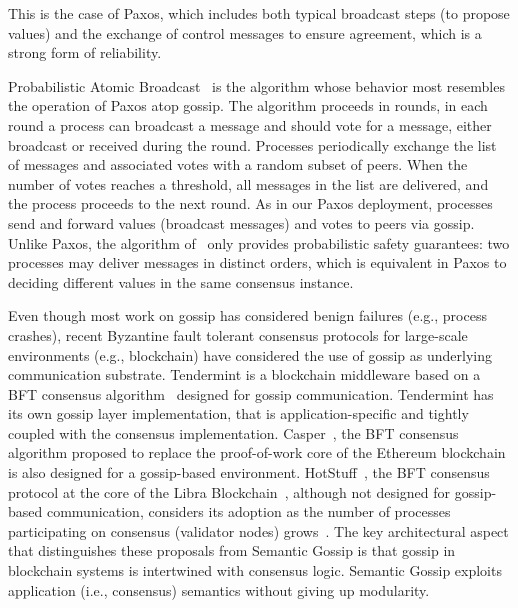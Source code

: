 \color{black}

This is the case of Paxos, which includes both typical broadcast steps (to
propose values) and the exchange of control messages to ensure agreement, which
is a strong form of reliability.

Probabilistic Atomic Broadcast~\cite{felber02} is the algorithm whose behavior
most resembles the operation of Paxos atop gossip.
The algorithm proceeds in rounds, in each round a process can broadcast a
message and should vote for a message, either broadcast or received during the
round.
Processes periodically exchange the list of messages and associated votes with
a random subset of peers.
When the number of votes reaches a threshold, all messages in the list are
delivered, and the process proceeds to the next round.
%
As in our Paxos deployment, processes send and forward values (broadcast
messages) and votes to peers via gossip.
Unlike Paxos, the algorithm of~\cite{felber02} only provides probabilistic
safety guarantees: two processes may deliver messages in distinct orders, which
is equivalent in Paxos to deciding different values in the same consensus
instance.

\color{teal}

Even though most work on gossip has considered benign failures (e.g., process crashes), 
recent Byzantine fault tolerant consensus protocols for large-scale environments (e.g., blockchain) 
have considered the use of gossip as underlying communication substrate.
Tendermint
is a blockchain middleware
based on a BFT consensus algorithm~\cite{bucham18} designed for gossip
communication.  Tendermint has its own gossip layer implementation, that is
application-specific and tightly coupled with the consensus implementation.
%
Casper~\cite{buterin17}, the BFT consensus algorithm proposed to replace the
proof-of-work core of the Ethereum blockchain is also designed for a
gossip-based environment.
%
HotStuff~\cite{maofan18}, the BFT consensus protocol at the core of the Libra
Blockchain~\cite{amsden20}, although not designed for gossip-based
communication, considers its adoption as the number of processes participating
on consensus (validator nodes) grows~\cite{libra18}.
The key architectural aspect that distinguishes these proposals from Semantic
Gossip is that gossip in blockchain systems is intertwined with consensus
logic.  Semantic Gossip exploits application (i.e., consensus) semantics
without giving up modularity.

\color{black}